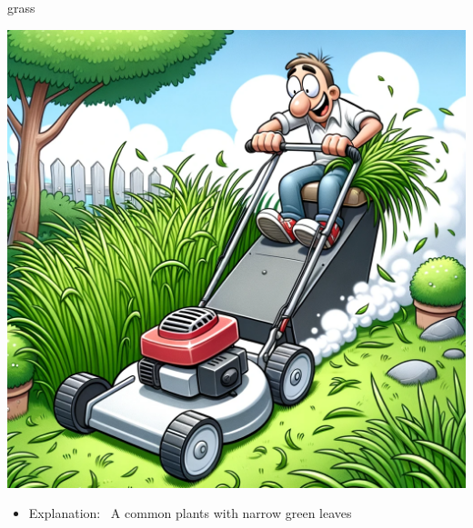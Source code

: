 \documentclass[avery5371, grid,frame]{flashcards}
\begin{document}
\renewcommand{\cardpaper}{a4paper}
\renewcommand{\cardpapermode}{landscape}
\renewcommand{\cardrows}{2}
\renewcommand{\cardcolumns}{2}
\setlength{\cardheight}{3.5in}
\setlength{\cardwidth}{5.0in}
\setlength{\topoffset}{0.65in}
\setlength{\oddoffset}{0.65in}
\setlength{\evenoffset}{0.65in}

\begin{flashcard}{grass}
    \vspace*{\fill}
    \begin{center}
        \begin{minipage}[c]{.45\textwidth}
            \includegraphics[width=\textwidth]{cards/g/grass/grass - a lawnmower cutting tall grass, leaving behind a neat and trimmed lawn.png}
        \end{minipage}
        \begin{minipage}[c]{.45\textwidth}
            \begin{itemize}\setlength\itemsep{12pt}
            \item Explanation: \ A common plants with narrow green leaves


\end{itemize}
\end{minipage}
\end{center}
\end{flashcard}
\end{document}
